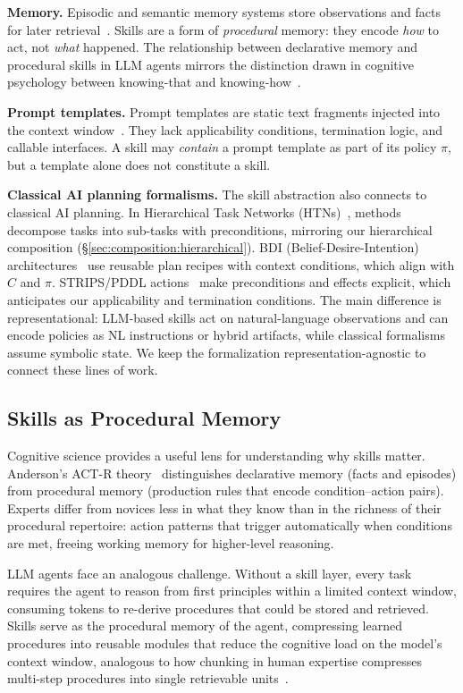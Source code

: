 \documentclass[conference, compsoc]{IEEEtran}
\theoremstyle{plain}
\newcommand{\para}[1]{\smallskip\noindent\textbf{#1.}}
\begin{document}
\para{Memory} Episodic and semantic memory systems store observations and facts for later retrieval~\cite{packer2023memgpt,hatalis2023memory,ma2025sok}. Skills are a form of \emph{procedural} memory: they encode \emph{how} to act, not \emph{what} happened. The relationship between declarative memory and procedural skills in LLM agents mirrors the distinction drawn in cognitive psychology between knowing-that and knowing-how~\cite{anderson2004actr}.

\para{Prompt templates} Prompt templates are static text fragments injected into the context window~\cite{white2023prompt}. They lack applicability conditions, termination logic, and callable interfaces. A skill may \emph{contain} a prompt template as part of its policy $\pi$, but a template alone does not constitute a skill.

\para{Classical AI planning formalisms} The skill abstraction also connects to classical AI planning. In Hierarchical Task Networks (HTNs)~\cite{nau2003shop2}, methods decompose tasks into sub-tasks with preconditions, mirroring our hierarchical composition (\S\ref{sec:composition:hierarchical}). BDI (Belief-Desire-Intention) architectures~\cite{rao1995bdi} use reusable plan recipes with context conditions, which align with $C$ and $\pi$. STRIPS/PDDL actions~\cite{fikes1971strips} make preconditions and effects explicit, which anticipates our applicability and termination conditions. The main difference is representational: LLM-based skills act on natural-language observations and can encode policies as NL instructions or hybrid artifacts, while classical formalisms assume symbolic state. We keep the formalization representation-agnostic to connect these lines of work.

\subsection{Skills as Procedural Memory}
\label{sec:def:procmem}

Cognitive science provides a useful lens for understanding why skills matter. Anderson’s ACT-R theory~\cite{anderson2004actr} distinguishes declarative memory (facts and episodes) from procedural memory (production rules that encode condition–action pairs). Experts differ from novices less in what they know than in the richness of their procedural repertoire: action patterns that trigger automatically when conditions are met, freeing working memory for higher-level reasoning.

LLM agents face an analogous challenge. Without a skill layer, every task requires the agent to reason from first principles within a limited context window, consuming tokens to re-derive procedures that could be stored and retrieved. Skills serve as the procedural memory of the agent, compressing learned procedures into reusable modules that reduce the cognitive load on the model's context window, analogous to how chunking in human expertise compresses multi-step procedures into single retrievable units~\cite{chase1973chess}.
\end{document}
